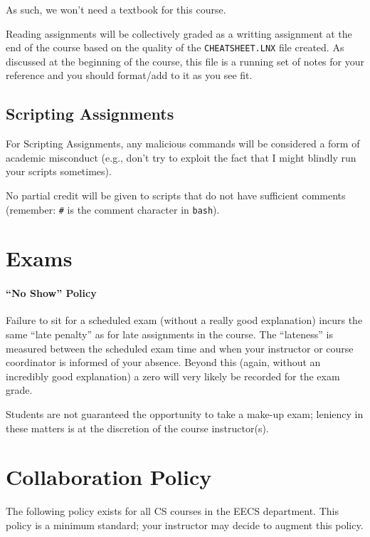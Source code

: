 \documentclass[12pt]{article}
\begin{document}
As such, we won't need a textbook for this course.

Reading assignments will be collectively graded as a writting assignment at the end of the course based on the quality of the \texttt{CHEATSHEET.LNX} file created. As
discussed at the beginning of the course, this file is a running set of notes for your reference and you should format/add to it as you see fit.

\subsection{Scripting Assignments}
For Scripting Assignments, any malicious commands will be considered a form of academic misconduct (e.g., don't try to exploit the fact that I might
blindly run your scripts sometimes).

No partial credit will be given to scripts that do not have sufficient comments (remember: \texttt{\#} is the comment character in \texttt{bash}).
\section{Exams}
\paragraph{``No Show'' Policy}
Failure to sit for a scheduled exam (without a really good explanation) incurs the same ``late penalty'' as for late assignments in the course. The
``lateness'' is measured between the scheduled exam time and when your instructor or course coordinator is informed of your absence.
Beyond this (again, without an incredibly good explanation) a zero will very likely be recorded for the exam grade.

Students are not guaranteed the opportunity to take a make-up exam; leniency in these matters is at the discretion of the course instructor(s).
\section{Collaboration Policy}
The following policy exists for all CS courses in the EECS department. This policy is a minimum standard; your instructor may decide to augment this
policy.
\end{document}
